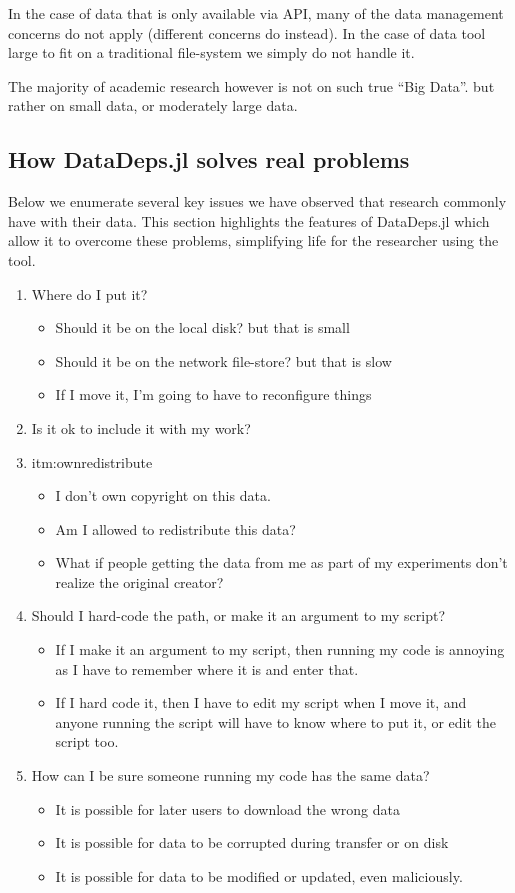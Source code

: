\documentclass{jors}
\begin{document}
In the case of data that is only available via API, many of the data management concerns do not apply (different concerns do instead).
In the case of data tool large to fit on a traditional file-system we simply do not handle it.

The majority of academic research however is not on such true ``Big Data''.
but rather on small data, or moderately large data.

\subsection{How DataDeps.jl solves real problems}
Below we enumerate several key issues we have observed  that research commonly have with their data.
This section highlights the features of DataDeps.jl which allow it to overcome these problems,
simplifying life for the researcher using the tool.

\begin{enumerate}
	\item Where do I put it? \label{itm:where}
	\begin{itemize}
		\item Should it be on the local disk? but that is small
		\item Should it be on the network file-store? but that is slow
		\item If I move it, I'm going to have to reconfigure things
	\end{itemize}
	\item Is it ok to include it with my work? \item{itm:ownredistribute}
	\begin{itemize}
		\item I don't own copyright on this data.
		\item Am I allowed to redistribute this data?
		\item What if people getting the data from me as part of my experiments don't realize the original creator?
	\end{itemize}
	\item Should I hard-code the path, or make it an argument to my script? \label{itm:path}
	\begin{itemize}
		\item If I make it an argument to my script, then running my code is annoying as I have to remember where it is and enter that.
		\item If I hard code it, then I have to edit my script when I move it, and anyone running the script will have to know where to put it, or edit the script too.
	\end{itemize}
	\item How can I be sure someone running my code has the same data?
	\begin{itemize}
		\item It is possible for later users to download the wrong data
		\item It is possible for data to be corrupted during transfer or on disk
		\item It is possible for data to be modified or updated, even maliciously.
	\end{itemize}
\end{enumerate}
\end{document}
